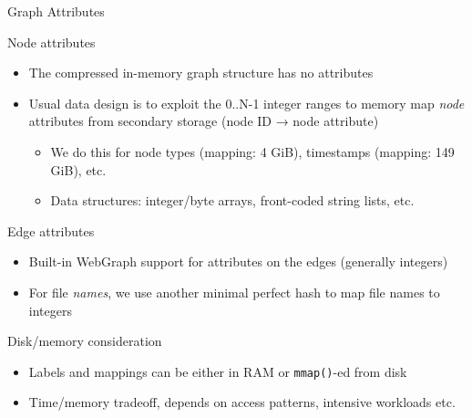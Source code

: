 \documentclass[aspectratio=169,xcolor=table]{beamer}
\begin{document}
    \begin{frame}{Graph Attributes}
        \begin{block}{Node attributes}
            \begin{itemize}
                \item The compressed in-memory graph structure has \alert{no attributes}
                \item Usual data design is to exploit the 0..N-1 integer ranges to \alert{memory map
                    \emph{node} attributes} from secondary storage (node ID →
                    node attribute)
                    \begin{itemize}
                        \item We do this for node types (mapping: 4 GiB),
                            timestamps (mapping: 149 GiB), etc.
                        \item Data structures: integer/byte arrays, front-coded
                            string lists, etc.
                    \end{itemize}
            \end{itemize}
        \end{block}
        \begin{block}{Edge attributes}
            \begin{itemize}
                \item Built-in WebGraph support for attributes on the \alert{edges} (generally integers)
                \item For file \emph{names}, we use another minimal perfect hash to map file names to integers
            \end{itemize}
        \end{block}
        \begin{block}{Disk/memory consideration}
            \begin{itemize}
                \item Labels and mappings can be either in RAM or
                    \texttt{mmap()}-ed from disk
                \item Time/memory tradeoff, depends on access patterns, intensive
                    workloads etc.
            \end{itemize}
        \end{block}
    \end{frame}
\end{document}
